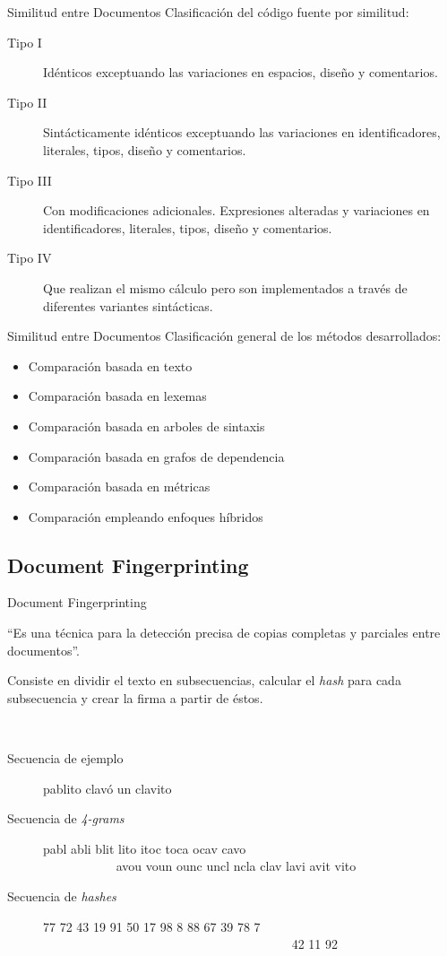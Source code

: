 \documentclass{beamer}
\begin{document}
\begin{frame}{Similitud entre Documentos}
Clasificación del código fuente por similitud:
\begin{description}
  \item [Tipo I] Idénticos exceptuando las variaciones en espacios, diseño y comentarios.
  \item [Tipo II] Sintácticamente idénticos exceptuando las variaciones en identificadores, literales, tipos, diseño y comentarios.
  \item [Tipo III] Con modificaciones adicionales. Expresiones alteradas y variaciones en identificadores, literales, tipos, diseño y comentarios.
  \item [Tipo IV] Que realizan el mismo cálculo pero son implementados a través de diferentes variantes sintácticas.
\end{description}
\end{frame}

\begin{frame}{Similitud entre Documentos}
Clasificación general de los métodos desarrollados:
\begin{itemize}
  \item Comparación basada en texto
  \item Comparación basada en lexemas
  \item Comparación basada en arboles de sintaxis
  \item Comparación basada en grafos de dependencia
  \item Comparación basada en métricas
  \item Comparación empleando enfoques híbridos
\end{itemize}
\end{frame}

\subsection{Document Fingerprinting}
\begin{frame}{Document Fingerprinting}
\begin{center}
``Es una técnica para la detección precisa de copias completas y parciales entre documentos''.
\end{center}

Consiste en dividir el texto en subsecuencias, calcular el \textit{hash} para cada 
subsecuencia y crear la firma a partir de éstos.

~
\begin{description}
  \item [Secuencia de ejemplo] pablito clavó un clavito
  \item [Secuencia de \textit{4-grams}] pabl abli blit lito itoc toca ocav cavo \\~~~~~~~~~~~ avou voun ounc uncl ncla clav lavi avit vito
  \item [Secuencia de \textit{hashes}] 77 72 43 19 91 50 17 98 8 88 67 39 78 7 \\~~~~~~~~~~~~~~~~~~~~~~~~~~~~~~~~~~~~~~~ 42 11 92
\end{description}
\end{frame}
\end{document}
